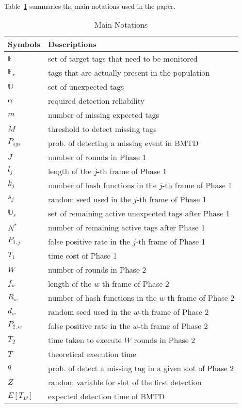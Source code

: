 \documentclass[10pt, twocolumn]{IEEEtran}
\begin{document}
Table~\ref{Tab:notation} summaries the main notations used in the paper.
\begin{table}[!htbp]
\centering
\caption{Main Notations}
\label{Tab:notation}
\begin{tabular}{|l|l|}
\hline
\textbf{Symbols} & \textbf{Descriptions}\\
\hline
$\mathbb{E}$& set of target tags that need to be monitored \\
\hline
$\mathbb{E}_r$& tags that are actually present in the population\\
\hline
$\mathbb{U}$& set of unexpected tags\\
\hline
$\alpha$& required detection reliability\\
\hline
$m$& number of missing expected tags\\
\hline
$M$& threshold to detect missing tags\\
\hline
$P_{sys}$& prob. of detecting a missing event in BMTD\\
\hline
$J$& number of rounds in Phase 1\\
\hline
$l_j$& length of the $j$-th frame of Phase 1 \\
\hline
$k_j$& number of hash functions in the $j$-th frame of Phase 1\\
\hline
$s_j$& random seed used in the $j$-th frame of Phase 1\\
\hline
$\mathbb{U}_r$ & set of remaining active unexpected tags after Phase 1\\
\hline
$N^*$ & number of remaining active tags after Phase 1\\
\hline
$P_{1,j}$& false positive rate in the $j$-th frame of Phase 1\\
\hline
$T_1$& time cost of Phase 1\\
\hline
$W$&number of rounds in Phase 2\\
\hline
$f_w$& length of the $w$-th frame of Phase 2 \\
\hline
$R_w$& number of hash functions in the $w$-th frame of Phase 2\\
\hline
$d_w$& random seed used in the $w$-th frame of Phase 2\\
\hline
$P_{2,w}$& false positive rate in the $w$-th frame of Phase 2\\
\hline
$T_2$& time taken to execute $W$ rounds in Phase 2\\
\hline
$T$& theoretical execution time\\
\hline
$q$& prob. of detect a missing tag in a given slot of Phase 2\\
\hline
$Z$& random variable for slot of the first detection\\
\hline
$E[T_D]$& expected detection time of BMTD\\
\hline
\end{tabular}
\end{table}
\end{document}
